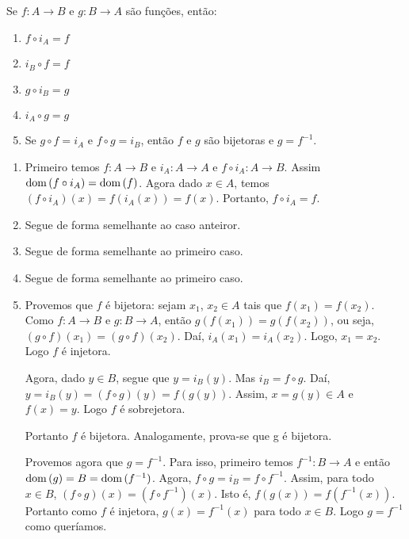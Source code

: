 \begin{proposicao}\label{propriedades_identidade}
    Se $f : A \to B$ e $g : B \to A$ são funções, então:
    \begin{enumerate}[label={\roman*})]
        \item $f\circ i_{A} = f$
        \item $i_{B}\circ f = f$
        \item $g\circ i_{B} = g$
        \item $i_{A}\circ g = g$
        \item Se $g\circ f = i_{A}$ e $f\circ g = i_{B}$, então $f$ e $g$ são bijetoras e $g=f^{-1}$.
    \end{enumerate}
\end{proposicao}
\begin{prova}
    \begin{enumerate}[label={\roman*})]
        \item Primeiro temos $f: A \to B$ e $i_{A} : A \to A$ e $f\circ i_{A} : A \to B$. Assim ${\rm dom\,}(f\circ i_{A}) = {\rm dom\,}(f)$. Agora dado $x \in A$, temos $(f\circ i_{A})(x) = f(i_{A}(x)) = f(x)$. Portanto, $f\circ i_{A} = f$.
        \item Segue de forma semelhante ao caso anteiror.
        \item Segue de forma semelhante ao primeiro caso.
        \item Segue de forma semelhante ao primeiro caso.
        \item Provemos que $f$ é bijetora: sejam $x_1$, $x_2 \in A$ tais que $f(x_1) = f(x_2)$. Como $f : A \to B$ e $g : B \to A$, então $g(f(x_1)) = g(f(x_2))$, ou seja, $(g\circ f)(x_1) = (g\circ f)(x_2)$. Daí, $i_{A}(x_1) = i_{A}(x_2)$. Logo, $x_1 = x_2$. Logo $f$ é injetora.

        Agora, dado $y \in B$, segue que $y = i_{B}(y)$. Mas $i_{B} = f\circ g$. Daí, $y = i_{B}(y) = (f\circ g)(y) = f(g(y))$. Assim, $x = g(y)\in A$ e $f(x) = y$. Logo $f$ é sobrejetora.

        Portanto $f$ é bijetora. Analogamente, prova-se que g é bijetora.

        Provemos agora que $g = f^{-1}$. Para isso, primeiro temos  $f^{-1} : B \to A$ e então ${\rm dom\,}(g) = B = {\rm dom\,}(f^{-1})$. Agora, $f\circ g = i_{B} = f\circ f^{-1}$. Assim, para todo $x \in B$, $(f\circ g)(x) = (f\circ f^{-1})(x)$. Isto é, $f(g(x)) = f(f^{-1}(x))$. Portanto como $f$ é injetora, $g(x) = f^{-1}(x)$ para todo $x\in B$. Logo $g = f^{-1}$ como queríamos.
    \end{enumerate}
\end{prova}

